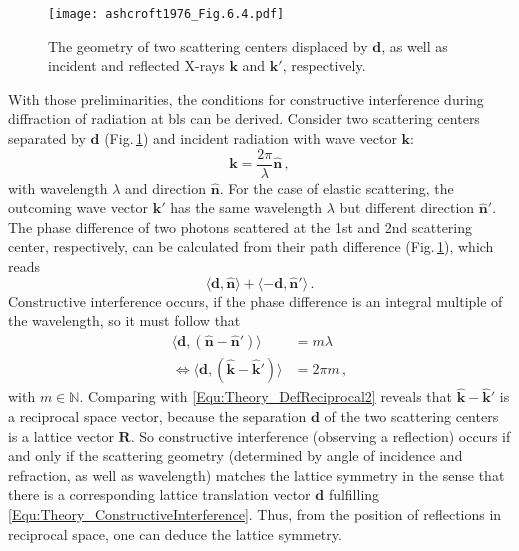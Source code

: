 \begin{figure}
    \centering
    \texttt{[image: ashcroft1976\_Fig.6.4.pdf]}
    \caption{The geometry of two scattering centers displaced by $\mathbf{d}$, as well as incident and reflected X-rays $\mathbf{k}$ and $\mathbf{k}'$, respectively.}
    \label{Fig:Theory_XRD_ashcroft1976}
\end{figure}
With those preliminarities, the conditions for constructive interference during dif\-frac\-tion of radiation at \glspl{bl} can be derived.
Consider two scattering centers separated by $\mathbf{d}$ (Fig.\,\ref{Fig:Theory_XRD_ashcroft1976}) and incident radiation with wave vector $\mathbf{k}$:
\begin{equation}
        \mathbf{k}=\frac{2\pi}{\lambda}\hat{\mathbf{n}}\,,
\end{equation}
with wavelength $\lambda$ and direction $\hat{\mathbf{n}}$.
For the case of elastic scattering, the outcoming wave vector $\mathbf{k}'$ has the same wavelength $\lambda$ but different direction $\hat{\mathbf{n}}'$.
The phase difference of two photons scattered at the 1st and 2nd scattering center, respectively, can be calculated from their path difference (Fig.\,\ref{Fig:Theory_XRD_ashcroft1976}), which reads
\begin{equation}\label{Equ:Theory_PathDifference}
    \langle\mathbf{d},\hat{\mathbf{n}}\rangle+\langle-\mathbf{d},\hat{\mathbf{n}}'\rangle\,.
\end{equation}
Constructive interference occurs, if the phase difference is an integral multiple of the wavelength, so it must follow that
\begin{align}
    \langle\mathbf{d},(\hat{\mathbf{n}}-\hat{\mathbf{n}}')\rangle&=m\lambda\\
    \Leftrightarrow\langle\mathbf{d},(\hat{\mathbf{k}}-\hat{\mathbf{k}}')\rangle&=2\pi m\,,
    \label{Equ:Theory_ConstructiveInterference}
\end{align}
with $m\in\mathbb{N}$.
Comparing with \eqref{Equ:Theory_DefReciprocal2} reveals that $\hat{\mathbf{k}}-\hat{\mathbf{k}}'$ is a reciprocal space vector, because the separation $\mathbf{d}$ of the two scattering centers is a lattice vector $\mathbf{R}$.
So constructive interference (observing a reflection) occurs if and only if the scattering geometry (determined by angle of incidence and refraction, as well as wavelength) matches the lattice symmetry in the sense that there is a corresponding lattice translation vector $\mathbf{d}$ fulfilling \eqref{Equ:Theory_ConstructiveInterference}.
Thus, from the position of reflections in reciprocal space, one can deduce the lattice symmetry.

